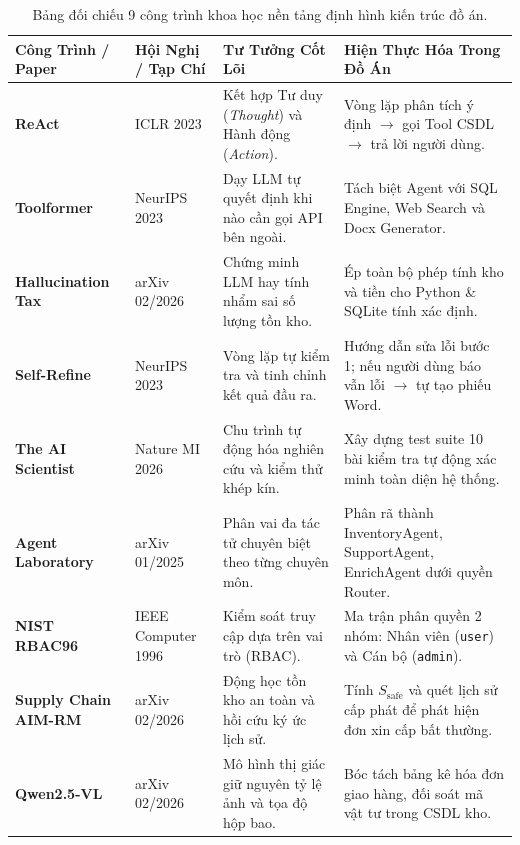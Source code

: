 \documentclass[11pt,a4paper]{article}
\begin{document}
\begin{table}[H]
\centering
\footnotesize
\renewcommand{\arraystretch}{1.2}
\begin{tabularx}{\textwidth}{p{2.8cm} l p{3.5cm} >{\raggedright\arraybackslash}X}
\toprule
\textbf{Công Trình / Paper} & \textbf{Hội Nghị / Tạp Chí} & \textbf{Tư Tưởng Cốt Lõi} & \textbf{Hiện Thực Hóa Trong Đồ Án} \\
\midrule
\textbf{ReAct} \cite{react2023} & ICLR 2023 & Kết hợp Tư duy (\textit{Thought}) và Hành động (\textit{Action}). & Vòng lặp phân tích ý định $\rightarrow$ gọi Tool CSDL $\rightarrow$ trả lời người dùng. \\
\textbf{Toolformer} \cite{toolformer2023} & NeurIPS 2023 & Dạy LLM tự quyết định khi nào cần gọi API bên ngoài. & Tách biệt Agent với SQL Engine, Web Search và Docx Generator. \\
\textbf{Hallucination Tax} \cite{hallucinationtax2026} & arXiv 02/2026 & Chứng minh LLM hay tính nhẩm sai số lượng tồn kho. & Ép toàn bộ phép tính kho và tiền cho Python \& SQLite tính xác định. \\
\textbf{Self-Refine} \cite{selfrefine2023} & NeurIPS 2023 & Vòng lặp tự kiểm tra và tinh chỉnh kết quả đầu ra. & Hướng dẫn sửa lỗi bước 1; nếu người dùng báo vẫn lỗi $\rightarrow$ tự tạo phiếu Word. \\
\textbf{The AI Scientist} \cite{aiscientist2026} & Nature MI 2026 & Chu trình tự động hóa nghiên cứu và kiểm thử khép kín. & Xây dựng test suite 10 bài kiểm tra tự động xác minh toàn diện hệ thống. \\
\textbf{Agent Laboratory} \cite{agentlab2025} & arXiv 01/2025 & Phân vai đa tác tử chuyên biệt theo từng chuyên môn. & Phân rã thành InventoryAgent, SupportAgent, EnrichAgent dưới quyền Router. \\
\textbf{NIST RBAC96} \cite{rbac1996} & IEEE Computer 1996 & Kiểm soát truy cập dựa trên vai trò (RBAC). & Ma trận phân quyền 2 nhóm: Nhân viên (\texttt{user}) và Cán bộ (\texttt{admin}). \\
\textbf{Supply Chain AIM-RM} \cite{supplychain2026} & arXiv 02/2026 & Động học tồn kho an toàn và hồi cứu ký ức lịch sử. & Tính $S_{\text{safe}}$ và quét lịch sử cấp phát để phát hiện đơn xin cấp bất thường. \\
\textbf{Qwen2.5-VL} \cite{qwen25vl2026} & arXiv 02/2026 & Mô hình thị giác giữ nguyên tỷ lệ ảnh và tọa độ hộp bao. & Bóc tách bảng kê hóa đơn giao hàng, đối soát mã vật tư trong CSDL kho. \\
\bottomrule
\end{tabularx}
\caption{Bảng đối chiếu 9 công trình khoa học nền tảng định hình kiến trúc đồ án.}
\end{table}
\end{document}
